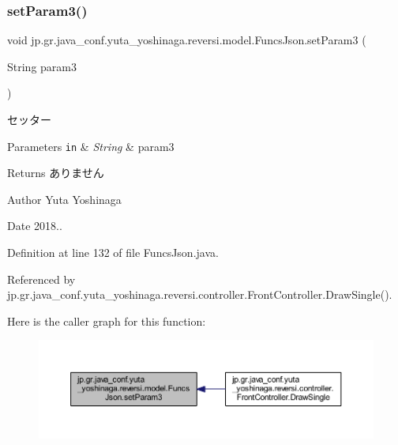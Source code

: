 \subsubsection{\texorpdfstring{set\+Param3()}{setParam3()}}
{\footnotesize\ttfamily void jp.\+gr.\+java\+\_\+conf.\+yuta\+\_\+yoshinaga.\+reversi.\+model.\+Funcs\+Json.\+set\+Param3 (\begin{DoxyParamCaption}\item[{String}]{param3 }\end{DoxyParamCaption})}



セッター 


\begin{DoxyParams}[1]{Parameters}
\mbox{\tt in}  & {\em String} & param3 \\
\hline
\end{DoxyParams}
\begin{DoxyReturn}{Returns}
ありません 
\end{DoxyReturn}
\begin{DoxyAuthor}{Author}
Yuta Yoshinaga 
\end{DoxyAuthor}
\begin{DoxyDate}{Date}
2018.. 
\end{DoxyDate}


Definition at line 132 of file Funcs\+Json.\+java.



Referenced by jp.\+gr.\+java\+\_\+conf.\+yuta\+\_\+yoshinaga.\+reversi.\+controller.\+Front\+Controller.\+Draw\+Single().

Here is the caller graph for this function\+:\nopagebreak
\begin{figure}[H]
\begin{center}
\leavevmode
\includegraphics[width=350pt]{classjp_1_1gr_1_1java__conf_1_1yuta__yoshinaga_1_1reversi_1_1model_1_1_funcs_json_a27bc732004c573269cb63e71c1d1abcc_icgraph}
\end{center}
\end{figure}
\mbox{\label{classjp_1_1gr_1_1java__conf_1_1yuta__yoshinaga_1_1reversi_1_1model_1_1_funcs_json_a44af51970635551127a296e3c07db7ec}} 
